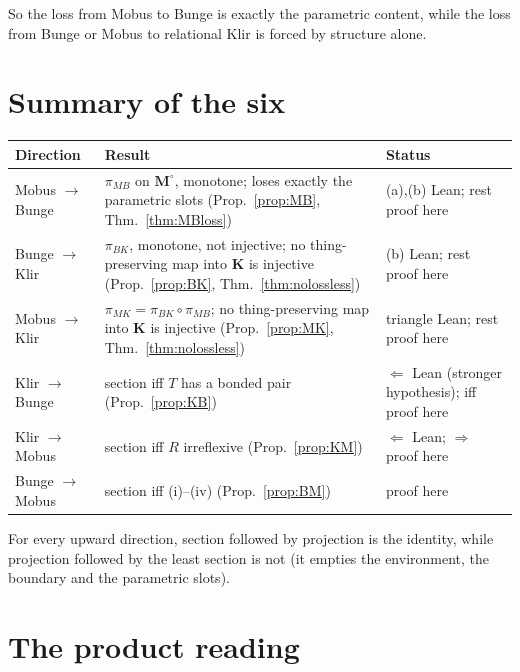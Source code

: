 \documentclass[11pt]{article}
\theoremstyle{definition}
\theoremstyle{remark}
\newcommand{\K}{\mathbf{K}}
\newcommand{\Mo}{\mathbf{M}^{\circ}}
\newcommand{\pBK}{\pi_{BK}}
\newcommand{\pMB}{\pi_{MB}}
\newcommand{\pMK}{\pi_{MK}}
\begin{document}
\noindent So the loss from Mobus to Bunge is exactly the parametric content, while the loss from Bunge or Mobus to relational Klir is forced by structure alone.

\section{Summary of the six}\label{sec:summary}

\begin{center}
\renewcommand{\arraystretch}{1.25}
\begin{tabular}{@{}l>{\raggedright\arraybackslash}p{6.3cm}>{\raggedright\arraybackslash}p{4.4cm}@{}}
\toprule
Direction & Result & Status\\
\midrule
Mobus $\to$ Bunge & $\pMB$ on $\Mo$, monotone; loses exactly the parametric slots (Prop.~\ref{prop:MB}, Thm.~\ref{thm:MBloss}) & (a),(b) Lean; rest proof here\\
Bunge $\to$ Klir & $\pBK$, monotone, not injective; no thing-preserving map into $\K$ is injective (Prop.~\ref{prop:BK}, Thm.~\ref{thm:nolossless}) & (b) Lean; rest proof here\\
Mobus $\to$ Klir & $\pMK=\pBK\circ\pMB$; no thing-preserving map into $\K$ is injective (Prop.~\ref{prop:MK}, Thm.~\ref{thm:nolossless}) & triangle Lean; rest proof here\\
Klir $\to$ Bunge & section iff $T$ has a bonded pair (Prop.~\ref{prop:KB}) & $\Leftarrow$ Lean (stronger hypothesis); iff proof here\\
Klir $\to$ Mobus & section iff $R$ irreflexive (Prop.~\ref{prop:KM}) & $\Leftarrow$ Lean; $\Rightarrow$ proof here\\
Bunge $\to$ Mobus & section iff (i)--(iv) (Prop.~\ref{prop:BM}) & proof here\\
\bottomrule
\end{tabular}
\end{center}

For every upward direction, section followed by projection is the identity, while projection followed by the least section is not (it empties the environment, the boundary and the parametric slots).

\section{The product reading}\label{sec:product}
\end{document}
